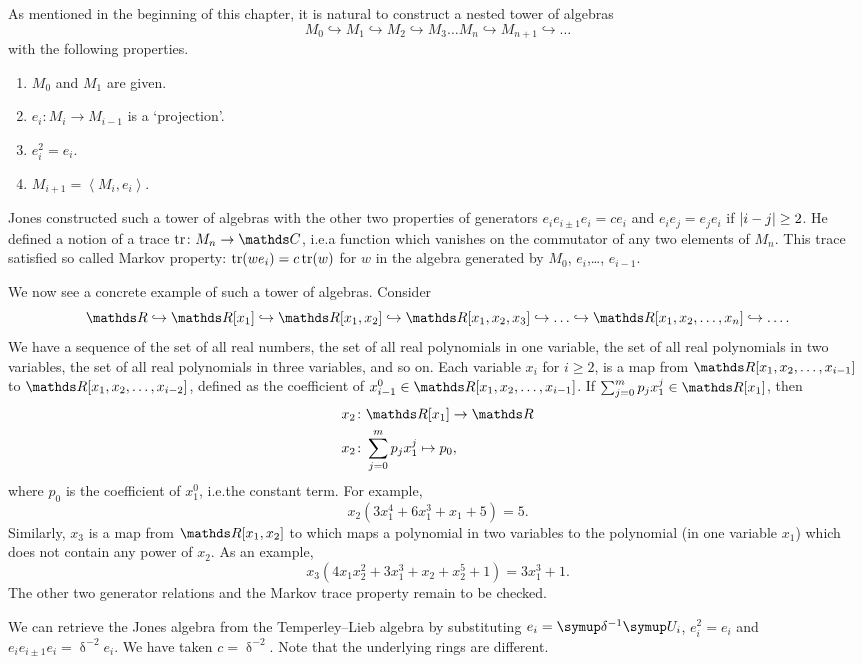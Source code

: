 As mentioned in the beginning of this chapter, it is natural to construct a nested tower of algebras \[M_0 \hookrightarrow M_1 \hookrightarrow M_2 \hookrightarrow M_3\ldots M_n \hookrightarrow M_{n+1} \hookrightarrow\ldots\] with the following properties.
\begin{enumerate}
    \item \(M_0\) and \(M_1\) are given.
	\item \(e_i\colon M_i \rightarrow M_{i-1}\) is a `projection'.
	\item \(e_i^2 = e_i\).
	\item \(M_{i+1} = \left\langle M_i,e_i\right\rangle\).
\end{enumerate}
Jones constructed such a tower of algebras with the other two properties of generators \(e_ie_{i\pm 1} e_i = ce_i\) and \(e_ie_j = e_je_i\) if \(\lvert i-j\rvert \geq 2\). He defined a notion of a trace \(\tr\colon M_n \rightarrow \C\), i.e.\@ a function which vanishes on the commutator of any two elements of \(M_n\). This trace satisfied so called Markov property: \(\operatorname{tr}(we_i) = c\operatorname{tr}(w)\) for \(w\) in the algebra generated by \(M_0\), \(e_i\),\ldots, \(e_{i-1}\).

We now see a concrete example of such a tower of algebras. Consider \[\R \hookrightarrow \R[x_1] \hookrightarrow \R[x_1, x_2] \hookrightarrow \R[x_1, x_2, x_3] \hookrightarrow \ldots \hookrightarrow \R[x_1, x_2, \ldots, x_n] \hookrightarrow \ldots.\] We have a sequence of the set of all real numbers, the set of all real polynomials in one variable, the set of all real polynomials in two variables, the set of all real polynomials in three variables, and so on. Each variable \(x_i\) for \(i\geq 2\), is a map from \(\R[x_1, x_2, \ldots, x_{i-1}]\) to \(\R[x_1, x_2, \ldots, x_{i-2}]\), defined as the coefficient of \(x_{i-1}^0 \in \R[x_1, x_2, \ldots, x_{i-1}]\). If \(\sum_{j=0}^{m}p_j x^{j}_1 \in \R[x_1]\), then
\begin{align*}
    x_2 &\colon \R[x_1] \rightarrow \R\\
	x_2 &\colon \sum_{j=0}^{m}p_j x^{j}_1 \mapsto p_0,
\end{align*}
where \(p_0\) is the coefficient of \(x_1^0\), i.e.\@ the constant term. For example, \[x_2 (3x_1^4 + 6x_1^3 + x_1 + 5) = 5.\] Similarly, \(x_3\) is a map from \(\R[x_1, x_2]\) to which maps a polynomial in two variables to the polynomial (in one variable \(x_1\)) which does not contain any power of \(x_2\). As an example, \[x_3(4x_1x_2^2 + 3x_1^3 + x_2 + x_2^5 + 1) = 3x_1^3 + 1.\] The other two generator relations and the Markov trace property remain to be checked.

We can retrieve the Jones algebra from the Temperley--Lieb algebra by substituting \(e_i = \updelta^{-1} \U_i\), \(e_i^2 = e_i\) and \(e_ie_{i\pm 1} e_i = \updelta^{-2}e_i\). We have taken \(c = \updelta^{-2}\). Note that the underlying rings are different.








